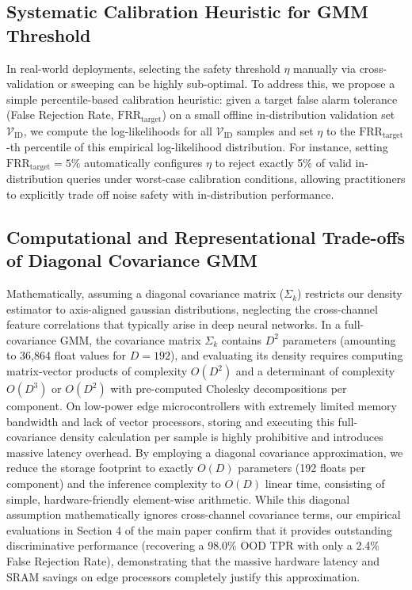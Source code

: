 \documentclass{article}
\theoremstyle{plain}
\theoremstyle{definition}
\theoremstyle{remark}
\begin{document}
\subsection{Systematic Calibration Heuristic for GMM Threshold}
In real-world deployments, selecting the safety threshold $\eta$ manually via cross-validation or sweeping can be highly sub-optimal. To address this, we propose a simple percentile-based calibration heuristic: given a target false alarm tolerance (False Rejection Rate, $\text{FRR}_{\text{target}}$) on a small offline in-distribution validation set $\mathcal{V}_{\text{ID}}$, we compute the log-likelihoods for all $\mathcal{V}_{\text{ID}}$ samples and set $\eta$ to the $\text{FRR}_{\text{target}}$-th percentile of this empirical log-likelihood distribution. For instance, setting $\text{FRR}_{\text{target}} = 5\%$ automatically configures $\eta$ to reject exactly 5\% of valid in-distribution queries under worst-case calibration conditions, allowing practitioners to explicitly trade off noise safety with in-distribution performance.

\subsection{Computational and Representational Trade-offs of Diagonal Covariance GMM}
Mathematically, assuming a diagonal covariance matrix ($\Sigma_k$) restricts our density estimator to axis-aligned gaussian distributions, neglecting the cross-channel feature correlations that typically arise in deep neural networks. In a full-covariance GMM, the covariance matrix $\Sigma_k$ contains $D^2$ parameters (amounting to 36,864 float values for $D=192$), and evaluating its density requires computing matrix-vector products of complexity $O(D^2)$ and a determinant of complexity $O(D^3)$ or $O(D^2)$ with pre-computed Cholesky decompositions per component. On low-power edge microcontrollers with extremely limited memory bandwidth and lack of vector processors, storing and executing this full-covariance density calculation per sample is highly prohibitive and introduces massive latency overhead. By employing a diagonal covariance approximation, we reduce the storage footprint to exactly $O(D)$ parameters (192 floats per component) and the inference complexity to $O(D)$ linear time, consisting of simple, hardware-friendly element-wise arithmetic. While this diagonal assumption mathematically ignores cross-channel covariance terms, our empirical evaluations in Section 4 of the main paper confirm that it provides outstanding discriminative performance (recovering a 98.0\% OOD TPR with only a 2.4\% False Rejection Rate), demonstrating that the massive hardware latency and SRAM savings on edge processors completely justify this approximation.
\end{document}
